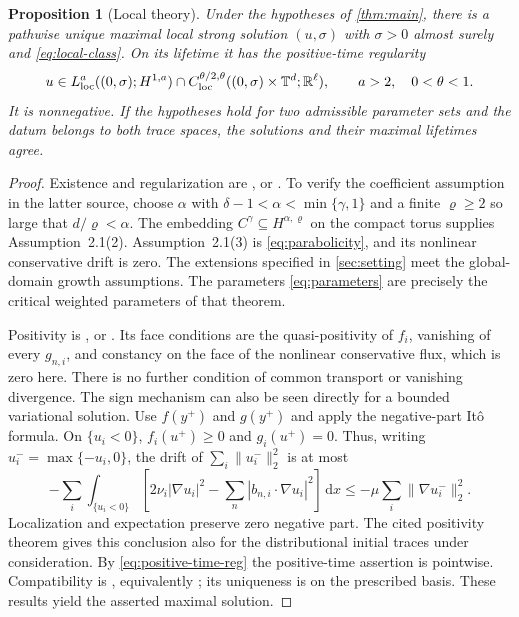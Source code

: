 \documentclass[11pt]{amsart}
\newtheorem{proposition}[theorem]{Proposition}
\theoremstyle{definition}
\newcommand{\T}{\mathbb T}
\newcommand{\R}{\mathbb R}
\newcommand{\dd}{\,\mathrm d}
\numberwithin{equation}{section}
\begin{document}
\begin{proposition}[Local theory]\label{prop:local}
Under the hypotheses of \cref{thm:main}, there is a pathwise unique
maximal local strong solution $(u,\sigma)$ with $\sigma>0$ almost surely
and \eqref{eq:local-class}. On its lifetime it has the positive-time
regularity
\begin{equation}\label{eq:positive-time-reg}
u\in L^a_{\rm loc}((0,\sigma);H^{1,a})
 \cap C^{\theta/2,\theta}_{\rm loc}((0,\sigma)\times\T^d;\R^\ell),
 \qquad a>2,\quad 0<\theta<1.
\end{equation}
It is nonnegative. If the hypotheses hold for two admissible parameter
sets and the datum belongs to both trace spaces, the solutions and their
maximal lifetimes agree.
\end{proposition}
\begin{proof}
Existence and regularization are
\cite[Theorem~8.6, pp.~98--99]{AVsurvey}, or
\cite[Theorem~2.7, p.~10]{AVlocal}. To verify the coefficient assumption
in the latter source, choose $\alpha$ with
$\delta-1<\alpha<\min\{\gamma,1\}$ and a finite $\varrho\geq2$ so
large that $d/\varrho<\alpha$. The embedding
$C^\gamma\subseteq H^{\alpha,\varrho}$ on the compact torus supplies
Assumption~2.1(2). Assumption~2.1(3) is
\eqref{eq:parabolicity}, and its nonlinear conservative drift is zero.
The extensions specified in \cref{sec:setting} meet the global-domain
growth assumptions. The parameters \eqref{eq:parameters} are precisely
the critical weighted parameters of that theorem.

Positivity is \cite[Proposition~8.10, p.~100]{AVsurvey}, or
\cite[Theorem~2.13, p.~13]{AVlocal}. Its face conditions are the
quasi-positivity of $f_i$, vanishing of every $g_{n,i}$, and constancy
on the face of the nonlinear conservative flux, which is zero here.
There is no further condition of common transport or vanishing
divergence. The sign mechanism can also be seen directly for a bounded
variational solution. Use $f(y^+)$ and $g(y^+)$ and apply the
negative-part It\^o formula. On $\{u_i<0\}$, $f_i(u^+)\geq0$ and
$g_i(u^+)=0$. Thus, writing $u_i^-=\max\{-u_i,0\}$, the drift of
$\sum_i\|u_i^-\|_2^2$ is at most
\[
-\sum_i\int_{\{u_i<0\}}
 \left[2\nu_i|\nabla u_i|^2
       -\sum_n|b_{n,i}\cdot\nabla u_i|^2\right]\dd x
 \leq-\mu\sum_i\|\nabla u_i^-\|_2^2.
\]
Localization and expectation preserve zero negative part. The cited
positivity theorem gives this conclusion also for the distributional
initial traces under consideration. By \eqref{eq:positive-time-reg}
the positive-time assertion is pointwise. Compatibility is
\cite[Proposition~8.8, p.~100]{AVsurvey}, equivalently
\cite[Proposition~3.5]{AVlocal}; its uniqueness is on the prescribed
basis. These results yield the asserted maximal solution.
\end{proof}
\end{document}
